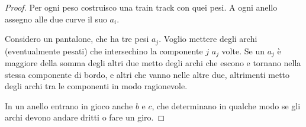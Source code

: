 \documentclass[a4paper]{article}
\theoremstyle{definition}
\begin{document}
    \begin{proof}
        Per ogni peso costruisco una train track con quei pesi. A ogni anello assegno alle due curve il suo $a_i$.

        Considero un pantalone, che ha tre pesi $a_j$. Voglio mettere degli archi (eventualmente pesati) che intersechino la componente $j$ $a_j$ volte. Se un $a_j$ è maggiore della somma degli altri due metto degli archi che escono e tornano nella stessa componente di bordo, e altri che vanno nelle altre due, altrimenti metto degli archi tra le componenti in modo ragionevole.

        In un anello entrano in gioco anche $b$ e $c$, che determinano in qualche modo se gli archi devono andare dritti o fare un giro.
    \end{proof}
    
    
    
\end{document}
